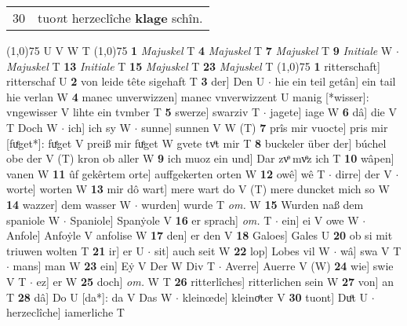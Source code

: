 \documentclass[8pt,a4paper,notitlepage]{article}
\begin{document}
\begin{table}[ht]
\begin{minipage}[t]{0.5\linewidth}
\begin{tabular}{rl}
30 & tuo\textit{n}t herzeclîche \textbf{klage} schîn.\\ 
\end{tabular}
\scriptsize
\line(1,0){75} \newline
U V W T \newline
\line(1,0){75} \newline
\textbf{1} \textit{Majuskel} T  \textbf{4} \textit{Majuskel} T  \textbf{7} \textit{Majuskel} T  \textbf{9} \textit{Initiale} W   $\cdot$ \textit{Majuskel} T  \textbf{13} \textit{Initiale} T  \textbf{15} \textit{Majuskel} T  \textbf{23} \textit{Majuskel} T  \newline
\line(1,0){75} \newline
\textbf{1} ritterschaft] ritterschaf U \textbf{2} von leide tête sigehaft T \textbf{3} der] Den U  $\cdot$ hie ein teil getân] ein tail hie verlan W \textbf{4} manec unverwizzen] manec vnverwizzent U manig [*wisser]: vngewisser V lihte ein tvmber T \textbf{5} swerze] swarziv T  $\cdot$ jagete] iage W \textbf{6} dâ] die V T Doch W  $\cdot$ ich] ich sy W  $\cdot$ sunne] sunnen V W (T) \textbf{7} prîs mir vuocte] pris mir [fuͤget*]: fuͤget V preiß mir fuͤget W gvete tvͦt mir T \textbf{8} buckeler über der] búchel obe der V (T) kron ob aller W \textbf{9} ich muoz ein und] Dar zvͦ mvͦz ich T \textbf{10} wâpen] vanen W \textbf{11} ûf gekêrtem orte] auffgekerten orten W \textbf{12} owê] wê T  $\cdot$ dirre] der V  $\cdot$ worte] worten W \textbf{13} mir dô wart] mere wart do V (T) mere duncket mich so W \textbf{14} wazzer] dem wasser W  $\cdot$ wurden] wurde T \textit{om.} W \textbf{15} Wurden naß dem spaniole W  $\cdot$ Spaniole] Spanẏole V \textbf{16} er sprach] \textit{om.} T  $\cdot$ ein] ei V owe W  $\cdot$ Anfole] Anfoẏle V anfolise W \textbf{17} den] er den V \textbf{18} Galoes] Gales U \textbf{20} ob si mit triuwen wolten T \textbf{21} ir] er U  $\cdot$ sit] auch seit W \textbf{22} lop] Lobes vil W  $\cdot$ wâ] swa V T  $\cdot$ mans] man W \textbf{23} ein] Eẏ V Der W Div T  $\cdot$ Averre] Auerre V (W) \textbf{24} wie] swie V T  $\cdot$ ez] er W \textbf{25} doch] \textit{om.} W T \textbf{26} ritterlîches] ritterlichen sein W \textbf{27} von] an T \textbf{28} dâ] Do U [da*]: da V Das W  $\cdot$ kleinœde] kleinoͤter V \textbf{30} tuont] Duͦt U  $\cdot$ herzeclîche] iamerliche T \newline
\end{minipage}
\end{table}
\end{document}
